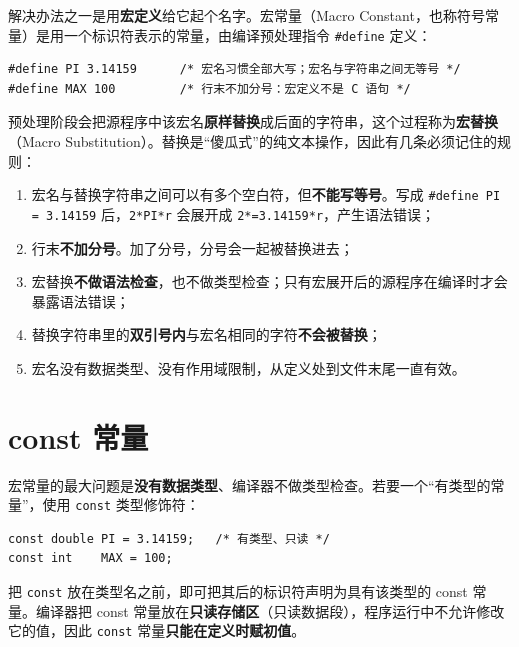 解决办法之一是用\textbf{宏定义}给它起个名字。宏常量（Macro Constant，也称符号常量）是用一个标识符表示的常量，由编译预处理指令 \texttt{\#define} 定义：

\begin{lstlisting}
#define PI 3.14159      /* 宏名习惯全部大写；宏名与字符串之间无等号 */
#define MAX 100         /* 行末不加分号：宏定义不是 C 语句 */
\end{lstlisting}

预处理阶段会把源程序中该宏名\textbf{原样替换}成后面的字符串，这个过程称为\textbf{宏替换}（Macro Substitution）。替换是“傻瓜式”的纯文本操作，因此有几条必须记住的规则：

\begin{enumerate}
  \item 宏名与替换字符串之间可以有多个空白符，但\textbf{不能写等号}。写成 \texttt{\#define PI = 3.14159} 后，\texttt{2*PI*r} 会展开成 \texttt{2*=3.14159*r}，产生语法错误；
  \item 行末\textbf{不加分号}。加了分号，分号会一起被替换进去；
  \item 宏替换\textbf{不做语法检查}，也不做类型检查；只有宏展开后的源程序在编译时才会暴露语法错误；
  \item 替换字符串里的\textbf{双引号内}与宏名相同的字符\textbf{不会被替换}；
  \item 宏名没有数据类型、没有作用域限制，从定义处到文件末尾一直有效。
\end{enumerate}

\section{const 常量}

宏常量的最大问题是\textbf{没有数据类型}、编译器不做类型检查。若要一个“有类型的常量”，使用 \texttt{const} 类型修饰符：

\begin{lstlisting}
const double PI = 3.14159;   /* 有类型、只读 */
const int    MAX = 100;
\end{lstlisting}

把 \texttt{const} 放在类型名之前，即可把其后的标识符声明为具有该类型的 const 常量。编译器把 const 常量放在\textbf{只读存储区}（只读数据段），程序运行中不允许修改它的值，因此 \texttt{const} 常量\textbf{只能在定义时赋初值}。

